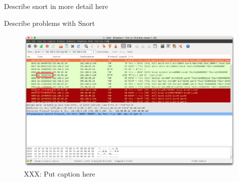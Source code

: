 Describe snort in more detail here

Describe problems with Snort

\begin{figure}[!t]
    \centering
    \includegraphics[width=\columnwidth]{figures/snort_slow}
    \caption{XXX: Put caption here}
    \label{fig:snort_slow}
\end{figure}
